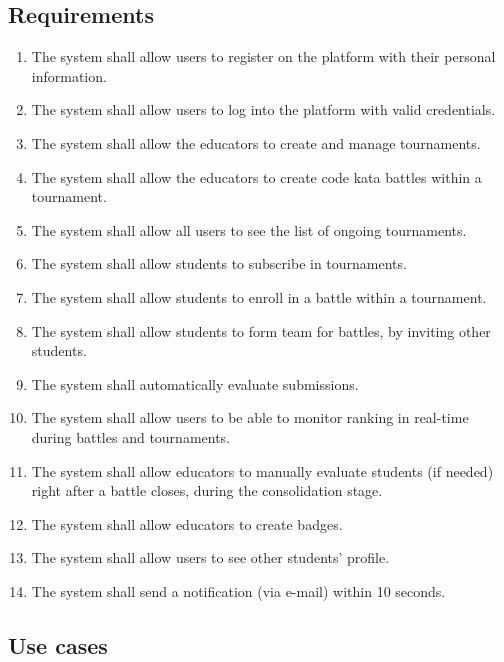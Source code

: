     \subsection{Requirements}
        \begin{enumerate}[series=requirements, label=\textbf{R.\arabic*}]
            \item {} {The system shall allow users to register on the platform with their personal information.}
            \item {} {The system shall allow users to log into the platform with valid credentials.}
            \item {} {The system shall allow the educators to create and manage tournaments.}
            \item {} {The system shall allow the educators to create code kata battles within a tournament.}
            \item {} {The system shall allow all users to see the list of ongoing tournaments.}
            \item {} {The system shall allow students to subscribe in tournaments.}
            \item {} {The system shall allow students to enroll in a battle within a tournament.}
            \item {} {The system shall allow students to form team for battles, by inviting other students.}
            \item {} {The system shall automatically evaluate submissions.}
            \item {} {The system shall allow users to be able to monitor ranking in real-time during battles and tournaments.}
            \item {} {The system shall allow educators to manually evaluate students (if needed) right after a battle closes, during the consolidation stage.}
            \item {} {The system shall allow educators to create badges.}
            \item {} {The system shall allow users to see other students' profile.}
            \item {} {The system shall send a notification (via e-mail) within 10 seconds.}
        \end{enumerate}

    \subsection{Use cases}

